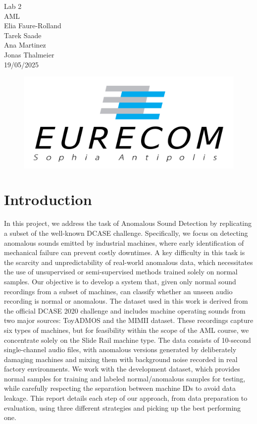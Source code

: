 \documentclass[ngerman]{scrartcl}
\begin{document}
\begin{titlepage}
\begin{center}
    \vspace{15cm}
    \huge{Lab 2}\\
    \vspace{2cm}
    \Huge{AML}\\
    \vspace{2cm}
    \Large{Elia Faure-Rolland}\\
    \Large{Tarek Saade}\\
    \Large{Ana Martinez}\\
    \Large{Jonas Thalmeier}\\
    \vspace{1cm}
    19/05/2025
\end{center}
\vspace{3cm}
\begin{figure}[h]
    \centering
    \includegraphics[width=.5\textwidth]{Figures/Eurecom.png}
\end{figure}
\end{titlepage}

\thispagestyle{empty}
\newpage
\setcounter{page}{1}

\section*{Introduction}
In this project, we address the task of Anomalous Sound Detection by replicating a subset of the well-known DCASE challenge. Specifically, we focus on detecting anomalous sounds emitted by industrial machines, where early identification of mechanical failure can prevent costly downtimes. A key difficulty in this task is the scarcity and unpredictability of real-world anomalous data, which necessitates the use of unsupervised or semi-supervised methods trained solely on normal samples. Our objective is to develop a system that, given only normal sound recordings from a subset of machines, can classify whether an unseen audio recording is normal or anomalous. The dataset used in this work is derived from the official DCASE 2020 challenge and includes machine operating sounds from two major sources: ToyADMOS and the MIMII dataset. These recordings capture six types of machines, but for feasibility within the scope of the AML course, we concentrate solely on the Slide Rail machine type. The data consists of 10-second single-channel audio files, with anomalous versions generated by deliberately damaging machines and mixing them with background noise recorded in real factory environments. We work with the development dataset, which provides normal samples for training and labeled normal/anomalous samples for testing, while carefully respecting the separation between machine IDs to avoid data leakage. This report details each step of our approach, from data preparation to evaluation, using  three different strategies and picking up the best performing one.
\end{document}
